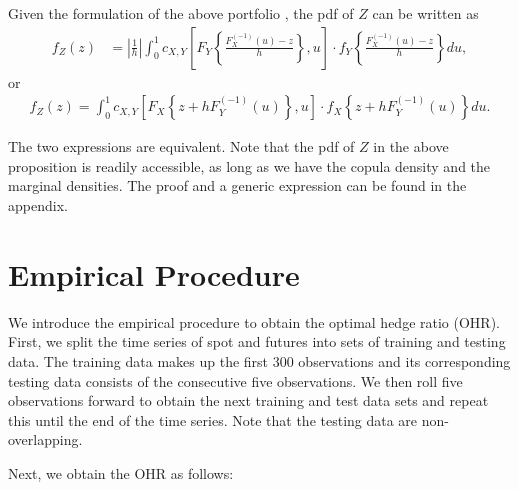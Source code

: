 \begin{corollary} Given the formulation of the above portfolio
  , the
  pdf of $Z$ can be written as 
  \begin{align}
  f_{Z}(z) &= \left|\frac{1}{h}\right|\int_0^1 c_{X, Y} \left[
  F_{Y}\left\{\frac{F^{(-1)}_{X}(u)-z}{h}\right\}, u
  \right]
   \cdot
  f_{Y}
  \left\{\frac{F^{(-1)}_{X}(u)-z}{h}\right\} du, \label{eq:density1}
  \end{align} or
    \begin{align}
      f_{Z}(z)
      = \int_0^1 c_{X, Y} \left[
      F_{X}\left\{z + h F^{(-1)}_{Y}(u)\right\}, u
      \right]
       \cdot
      f_{X}
      \left\{
      z+ hF^{(-1)}_{Y}(u)
      \right\} du. \label{eq:density2}
  \end{align}
  \end{corollary}
The two expressions are equivalent.
Note that the pdf of $Z$ in the above proposition is readily
accessible, as long as we have the copula density and the marginal
densities. The proof and a generic expression can be found in the
appendix. \medskip

\section{Empirical Procedure}\label{sec:empirical-procedure}
We introduce the empirical procedure to obtain the optimal hedge ratio (OHR).
First, we split the time series of spot and futures into sets of
training and testing data. The training data makes up the first 300
observations and its corresponding testing data consists of the
consecutive five observations. 
We then roll five observations forward to obtain the next training and
test data sets and repeat this until the end of the time series. 
Note that the testing data are non-overlapping. 

Next, we obtain the OHR as follows:

